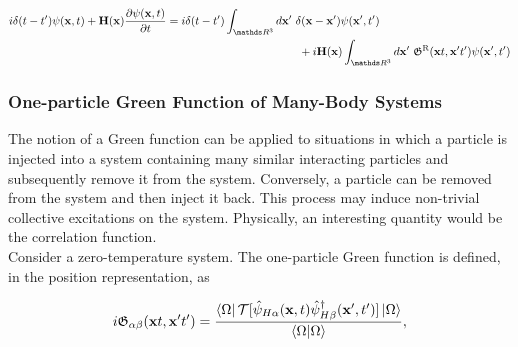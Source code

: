 {\begin{equation}
\begin{split}
        &  i \delta(t-t') \psi({\bf x}, t) + {\bf H}({\bf x}) \frac{\partial \psi({\bf x}, t)}{\partial t} = i \delta(t-t') \int_{\R^3} d{\bf x}' \blanky \delta({\bf x}- {\bf x}')\psi({\bf x}', t') \\
        & \blanky\blanky\blanky\blanky\blanky\blanky\blanky\blanky\blanky\blanky\blanky\blanky\blanky\blanky\blanky\blanky\blanky\blanky\blanky\blanky\blanky\blanky\blanky\blanky\blanky\blanky\blanky\blanky\blanky\blanky\blanky\blanky \blanky\blanky\blanky\blanky\blanky\blanky\blanky\blanky\blanky\blanky\blanky\blanky\blanky\blanky\blanky\blanky\blanky\blanky\blanky\blanky\blanky\blanky\blanky\blanky\blanky\blanky\blanky\blanky\blanky\blanky\blanky\blanky\blanky\blanky\blanky\blanky\blanky\blanky\blanky\blanky\blanky\blanky\blanky\blanky\blanky + i {\bf H}({\bf x}) \int_{\R^3} d{\bf x}' \blanky  \mathfrak{G}^{\textnormal{R}}({\bf x}t, {\bf x}'t') \psi({\bf x}', t')
    \end{split}
\end{equation}
}\fi

\subsubsection{One-particle Green Function of Many-Body Systems}

The notion of a Green function can be applied to situations in which a particle is injected into a system containing many similar interacting particles and subsequently remove it from the system. Conversely, a particle can be removed from the system and then inject it back. This process may induce non-trivial collective excitations on the system. Physically, an interesting quantity would be the correlation function. \\

Consider a zero-temperature system. The one-particle Green function is defined, in the position representation, as 

\begin{equation}
    i \mathfrak{G}_{\alpha \beta} ({\bf x}t, {\bf x}'t') = \frac{\bra{\Omega} \mathcal{T} [\hat{\psi}_{H \alpha}({\bf x}, t) \hat{\psi}^\dagger_{H \beta}({\bf x}', t')] \ket{\Omega}}{\bra{\Omega}\ket{\Omega}},
    \label{SR-1particle-GF}
\end{equation}

